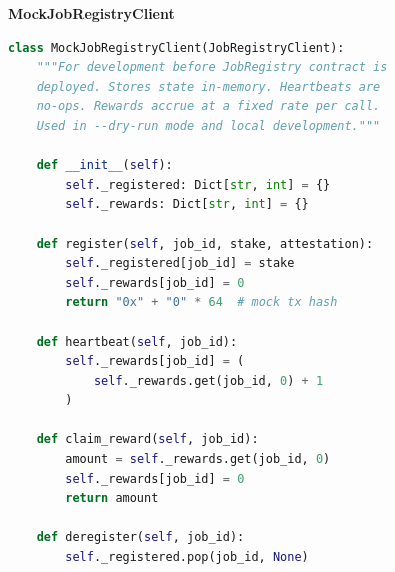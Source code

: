 \documentclass[11pt,a4paper]{article}
\begin{document}
\begin{contractbox}
\textbf{MockJobRegistryClient}
\begin{lstlisting}[language=Python]
class MockJobRegistryClient(JobRegistryClient):
    """For development before JobRegistry contract is
    deployed. Stores state in-memory. Heartbeats are
    no-ops. Rewards accrue at a fixed rate per call.
    Used in --dry-run mode and local development."""

    def __init__(self):
        self._registered: Dict[str, int] = {}
        self._rewards: Dict[str, int] = {}

    def register(self, job_id, stake, attestation):
        self._registered[job_id] = stake
        self._rewards[job_id] = 0
        return "0x" + "0" * 64  # mock tx hash

    def heartbeat(self, job_id):
        self._rewards[job_id] = (
            self._rewards.get(job_id, 0) + 1
        )

    def claim_reward(self, job_id):
        amount = self._rewards.get(job_id, 0)
        self._rewards[job_id] = 0
        return amount

    def deregister(self, job_id):
        self._registered.pop(job_id, None)
\end{lstlisting}
\end{contractbox}
\end{document}
